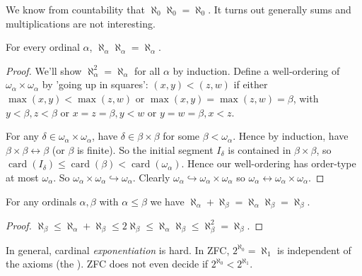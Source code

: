 \documentclass[a4paper, 10pt, twocolumn]{amsart}
\begin{document}
We know from countability that $\aleph_0 \aleph_0 = \aleph_0$. It turns out generally sums and multiplications are not interesting.
\begin{theorem}
  For every ordinal $\alpha$, $\aleph_\alpha \aleph_\alpha = \aleph_\alpha$.
\end{theorem}
\begin{proof}
  We'll show $\aleph_\alpha^2=\aleph_\alpha$ for all $\alpha$ by induction. Define a well-ordering of $\omega_\alpha \times \omega_\alpha$ by 'going up in squares': $(x, y)<(z, w)$ if either $\max (x, y)<\max (z, w)$ or $\max (x, y)=\max (z, w)=\beta$, with $y<\beta, z<\beta$ or $x=z=\beta, y<w$ or $y=w=\beta, x<z$.

  For any $\delta \in \omega_\alpha \times \omega_\alpha$, have $\delta \in \beta \times \beta$ for some $\beta<\omega_\alpha$. Hence by induction, have $\beta \times \beta \leftrightarrow \beta$ (or $\beta$ is finite). So the initial segment $I_\delta$ is contained in $\beta \times \beta$, so $\operatorname{card}\left(I_\delta\right) \leq \operatorname{card}(\beta)<\operatorname{card}\left(\omega_\alpha\right)$. Hence our well-ordering has order-type at most $\omega_\alpha$. So $\omega_\alpha \times \omega_\alpha \hookrightarrow \omega_\alpha$. Clearly $\omega_\alpha \hookrightarrow \omega_\alpha \times \omega_\alpha$ so $\omega_\alpha \leftrightarrow \omega_\alpha \times \omega_\alpha$.
\end{proof}

\begin{corollary}
  For any ordinals $\alpha, \beta$ with $\alpha \leq \beta$ we have $\aleph_\alpha + \aleph_\beta = \aleph_\alpha \aleph_\beta = \aleph_\beta$. 
\end{corollary}
\begin{proof}
  $\aleph_\beta \leq \aleph_\alpha+\aleph_\beta \leq 2 \aleph_\beta \leq \aleph_\alpha \aleph_\beta \leq \aleph_\beta^2=\aleph_\beta$.
\end{proof}

In general, cardinal \emph{exponentiation} is hard. In ZFC, $2^{\aleph_0} = \aleph_1$ is independent of the axioms (the ). 
ZFC does not even decide if $2^{\aleph_0} < 2^{\aleph_1}$.

\end{document}
